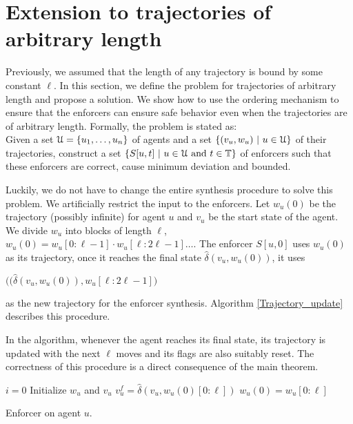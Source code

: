 \section{Extension to trajectories of arbitrary length}

Previously, we assumed that the length of any trajectory is bound by some constant $\ell$. %
In this section, we define the problem for trajectories of arbitrary length and propose a solution. We show how to use the ordering mechanism to ensure that the enforcers can ensure safe behavior even when the trajectories are of arbitrary length. Formally, the problem is stated as: \\


Given a set $\mathcal{U} = \{u_1,\dots,u_n\}$ of agents and a set $\{(v_u,w_u)~|~u \in \mathcal{U} \}$ of their trajectories, 
construct a set $\{S[u,t]~|~u \in \mathcal{U} \text{ and } t \in \mathbb{T}\}$ of enforcers such that these enforcers are correct, cause minimum deviation and bounded. 


Luckily, we do not have to change the entire synthesis procedure to solve this problem. We artificially restrict the input to the enforcers. Let $w_u(0)$ be the trajectory (possibly infinite) for agent $u$ and $v_u$ be the start state of the agent. 
We divide $w_u$ into blocks of length $\ell$, $w_u(0) =w_u[0:\ell-1]\cdot w_u[\ell:2\ell-1]\dots.$ The enforcer $S[u,0]$ uses $w_u(0)$ as its trajectory, once it reaches the final state $\hat{\delta}(v_u,w_u(0))$, it uses \begin{small}$\big( (\hat{\delta}(v_u,w_u(0)),  w_u[\ell:2\ell-1] \big)$ \end{small} as the new trajectory for the enforcer synthesis. Algorithm \ref{Trajectory_update} describes this procedure.


In the algorithm, whenever the agent reaches its final state, its trajectory is updated with the next $\ell$ moves and its flags are also suitably reset. The correctness of this procedure is a direct consequence of the main theorem.


\begin{algorithm}
$i=0$\;
Initialize $w_u$ and $v_u$\;
$v_u^f = \hat{\delta}(v_u,w_u(0)[0:\ell])$\;
$w_u(0) = w_u[0:\ell]$\;
\caption{Enforcer on agent $u$.}
\label{Trajectory_update}
\end{algorithm}

